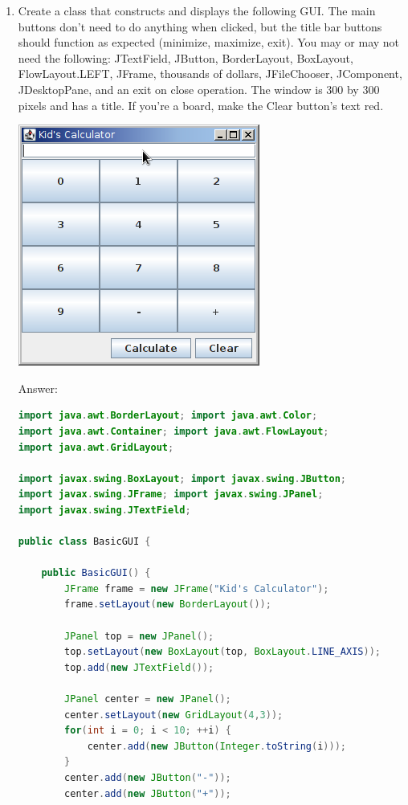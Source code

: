 \documentclass[11pt]{article}
\newenvironment{answer}{\large\lstset{basicstyle=\large\ttfamily}\color{white} \small{Answer:}}{}
\newenvironment{answer}{\large\lstset{basicstyle=\large\ttfamily}\color{red} \small{Answer:}}{}
\begin{document}
\begin{enumerate}
\item Create a class that constructs and displays the following GUI.  The main buttons don't need to do anything when clicked, but the title bar buttons should function as expected (minimize, maximize, exit).  You may or may not need the following: JTextField, JButton, BorderLayout, BoxLayout, FlowLayout.LEFT, JFrame, thousands of dollars, JFileChooser, JComponent, JDesktopPane, and an exit on close operation.  The window is 300 by 300 pixels and has a title.  If you're a board, make the Clear button's text red.
\begin{flushright}
\includegraphics[scale=0.6]{calculator.png}
\end{flushright}
\begin{answer}
\begin{lstlisting}[language=java]
import java.awt.BorderLayout; import java.awt.Color;
import java.awt.Container; import java.awt.FlowLayout;
import java.awt.GridLayout;

import javax.swing.BoxLayout; import javax.swing.JButton;
import javax.swing.JFrame; import javax.swing.JPanel;
import javax.swing.JTextField;

public class BasicGUI {

	public BasicGUI() {
		JFrame frame = new JFrame("Kid's Calculator");
		frame.setLayout(new BorderLayout());
		
		JPanel top = new JPanel();
		top.setLayout(new BoxLayout(top, BoxLayout.LINE_AXIS));
		top.add(new JTextField());
		
		JPanel center = new JPanel();
		center.setLayout(new GridLayout(4,3));
		for(int i = 0; i < 10; ++i) {
			center.add(new JButton(Integer.toString(i)));
		}
		center.add(new JButton("-"));
		center.add(new JButton("+"));
		

\end{lstlisting}
\end{answer}
\end{enumerate}
\end{document}
